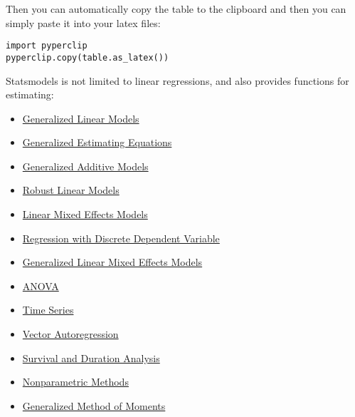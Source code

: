 \documentclass[12pt, a4paper]{article}
\begin{document}
Then you can automatically copy the table to the clipboard and then you can simply paste it into your latex files:
\lstset{language=jupyter-python,label= ,caption= ,captionpos=b,numbers=none}
\begin{lstlisting}
import pyperclip
pyperclip.copy(table.as_latex())
\end{lstlisting}

Statsmodels is not limited to linear regressions, and also provides functions for estimating:
\begin{itemize}
\item \href{https://www.statsmodels.org/stable/glm.html}{Generalized Linear Models}
\item \href{https://www.statsmodels.org/stable/gee.html}{Generalized Estimating Equations}
\item \href{https://www.statsmodels.org/stable/gam.html}{Generalized Additive Models}
\item \href{https://www.statsmodels.org/stable/rlm.html}{Robust Linear Models}
\item \href{https://www.statsmodels.org/stable/mixed\_linear.html}{Linear Mixed Effects Models}
\item \href{https://www.statsmodels.org/stable/discretemod.html}{Regression with Discrete Dependent Variable}
\item \href{https://www.statsmodels.org/stable/mixed\_glm.html}{Generalized Linear Mixed Effects Models}
\item \href{https://www.statsmodels.org/stable/anova.html}{ANOVA}
\item \href{https://www.statsmodels.org/stable/tsa.html}{Time Series}
\item \href{https://www.statsmodels.org/stable/vector\_ar.html}{Vector Autoregression}
\item \href{https://www.statsmodels.org/stable/duration.html}{Survival and Duration Analysis}
\item \href{https://www.statsmodels.org/stable/nonparametric.html}{Nonparametric Methods}
\item \href{https://www.statsmodels.org/stable/gmm.html}{Generalized Method of Moments}
\end{itemize}
\end{document}
